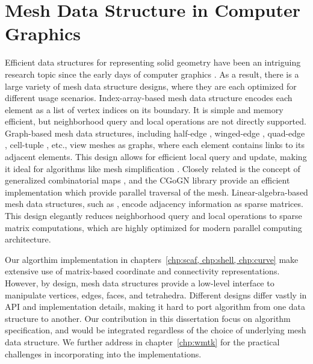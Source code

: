 \section{Mesh Data Structure in Computer Graphics}
\label{wmtk:sec:related}
Efficient data structures for representing solid geometry have been an intriguing
research topic since the early days of computer graphics \cite{Requicha1980}. As
a result, there is a large variety of mesh data structure designs, where they
are each optimized for different usage scenarios. Index-array-based mesh data
structure encodes each element as a list of vertex indices on its
boundary.  It is simple and memory efficient, but neighborhood query and local
operations are not directly supported.
Graph-based mesh data structures, including half-edge \cite{Maentylae1987},
winged-edge \cite{Baumgart1972}, quad-edge \cite{Guibas1985}, cell-tuple
\cite{Brisson1989}, etc., view meshes as graphs, where each element contains
links to its adjacent elements. This design allows for efficient local query
and update, making it ideal for algorithms like mesh simplification
\cite{garland1997surface}. 
{Closely related is the concept of generalized combinatorial maps \cite{lienhardt1994n, dufourd1991obj3}, and the CGoGN library \cite{kraemer2014cgogn} provide an efficient implementation which provide parallel traversal of the mesh.}
Linear-algebra-based mesh data structures, such as
\cite{Dicarlo2014,Zayer2017,Mahmoud2021}, encode adjacency information as sparse
matrices.  This design elegantly reduces neighborhood query and local operations
to sparse matrix computations, which are highly optimized for modern parallel
computing architecture. 

%
Our algorthim implementation in chapters~\ref{chp:scaf, chp:shell, chp:curve} make extensive use of matrix-based coordinate and connectivity representations. 
However, by design, mesh data structures provide a low-level interface to
manipulate vertices, edges, faces, and tetrahedra.
Different designs differ vastly in API and implementation details, making it hard to port algorithm from one data structure to another. 
Our contribution in this dissertation focus on algorithm specification, and would be integrated regardless of the choice of underlying mesh data structure. We further address in chapter~\ref{chp:wmtk} for the practical challenges in incorporating into the implementations. 

